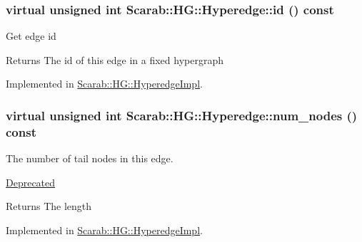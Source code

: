\hypertarget{class_scarab_1_1_h_g_1_1_hyperedge_af824beb7107253a7545b35992c17e057}{
\subsubsection[{id}]{\setlength{\rightskip}{0pt plus 5cm}virtual unsigned int Scarab::HG::Hyperedge::id () const}}
\label{class_scarab_1_1_h_g_1_1_hyperedge_af824beb7107253a7545b35992c17e057}
Get edge id

\begin{DoxyReturn}{Returns}
The id of this edge in a fixed hypergraph 
\end{DoxyReturn}


Implemented in \hyperlink{class_scarab_1_1_h_g_1_1_hyperedge_impl_afa81943347267781c25c4e68f7f5f547}{Scarab::HG::HyperedgeImpl}.

\hypertarget{class_scarab_1_1_h_g_1_1_hyperedge_a799d8d98242c129d7eee178bdf1fb535}{
\subsubsection[{num\_\-nodes}]{\setlength{\rightskip}{0pt plus 5cm}virtual unsigned int Scarab::HG::Hyperedge::num\_\-nodes () const}}
\label{class_scarab_1_1_h_g_1_1_hyperedge_a799d8d98242c129d7eee178bdf1fb535}
The number of tail nodes in this edge. \begin{Desc}
\item[\hyperlink{deprecated__deprecated000004}{Deprecated}]\end{Desc}
\begin{DoxyReturn}{Returns}
The length 
\end{DoxyReturn}


Implemented in \hyperlink{class_scarab_1_1_h_g_1_1_hyperedge_impl_a9a5bef8789c9c7caee6f53833ea4acc7}{Scarab::HG::HyperedgeImpl}.

